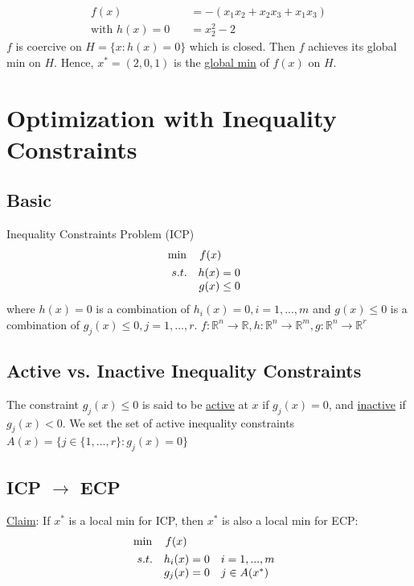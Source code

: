 \documentclass[11pt,a4paper]{article}
\begin{document}
\begin{equation}
    \begin{aligned}
        f(x)&=-(x_1x_2+x_2x_3+x_1x_3)\\
        \text{with }h(x)=0\quad &=x_2^2-2
    \end{aligned}
    \nonumber
\end{equation}
$f$ is coercive on $H=\{x:h(x)=0\}$ which is closed. Then $f$ achieves its global min on $H$. Hence, $x^*=(2,0,1)$ is the \underline{global min} of $f(x)$ on $H$.

\section{Optimization with Inequality Constraints}
\subsection{Basic}
Inequality Constraints Problem (ICP)
\begin{align*}
    &\min\quad f(x)\\
    &\begin{array}{r@{\quad}r@{}l@{\quad}l}
    s.t.
    &h(x)=0&\\
    &g(x)\leq 0&\\
\end{array}
\end{align*}
where $h(x)=0$ is a combination of $h_i(x)=0,i=1,...,m$ and $g(x)\leq 0$ is a combination of $g_j(x)\leq 0,j=1,...,r$. $f:\mathbb{R}^n \rightarrow \mathbb{R}, h:\mathbb{R}^n \rightarrow \mathbb{R}^m, g:\mathbb{R}^n \rightarrow \mathbb{R}^r$

\subsection{Active vs. Inactive Inequality Constraints}
The constraint $g_j(x)\leq 0$ is said to be \underline{active} at $x$ if $g_j(x)=0$, and \underline{inactive} if $g_j(x)<0$. We set the set of active inequality constraints $A(x)=\{j\in\{1,...,r\}:g_j(x)=0\}$

\subsection{ICP $\rightarrow$ ECP}
\underline{Claim}: If $x^*$ is a local min for ICP, then $x^*$ is also a local min for ECP:
\begin{align*}
    &\min\quad f(x)\\
    &\begin{array}{r@{\quad}r@{}l@{\quad}l}
    s.t.
    &h_i(x)=0\quad&i=1,...,m\\
    &g_j(x)= 0\quad&j\in A(x^*)\\
\end{array}
\end{align*}
\end{document}

